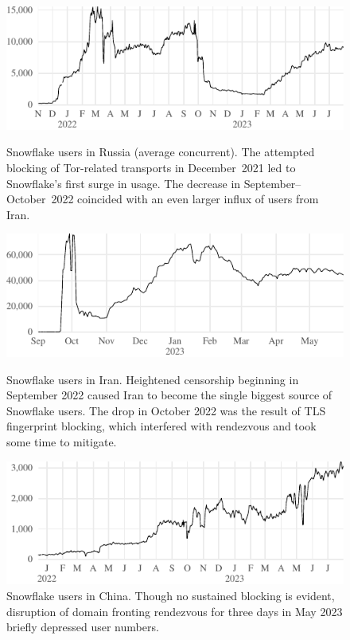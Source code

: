 \documentclass[letterpaper,twocolumn]{article}
\begin{document}
\begin{figure}
\begin{minipage}[t][\textheight][b]{\linewidth}
\includegraphics{figures/users/users-ru}
\caption{
Snowflake users in Russia (average concurrent).
The attempted blocking of Tor-related transports in December~2021
led to Snowflake's first surge in usage.
The decrease in September--October~2022
coincided with an even larger influx of users from Iran.
\label{fig:client-counts-ru}
}
\vfill
\includegraphics{figures/users/users-ir}
\caption{
Snowflake users in Iran.
Heightened censorship beginning in September 2022
caused Iran to become the single biggest source of Snowflake users.
The drop in October 2022
was the result of TLS fingerprint blocking,
which interfered with rendezvous
and took some time to mitigate.
\label{fig:client-counts-ir}
}
\vfill
\includegraphics{figures/users/users-cn}
\caption{
Snowflake users in China.
Though no sustained blocking is evident,
disruption of domain fronting rendezvous
for three days in May 2023 briefly
depressed user numbers.
\label{fig:client-counts-cn}
}
\end{minipage}
\end{figure}
\end{document}
